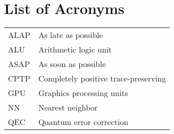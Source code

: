 \chapter*{List of Acronyms}

\begin{table}[ht]
\centering
\begin{tabular}{ll}
ALAP & As late as possible\\
ALU & Arithmetic logic unit\\
ASAP & As soon as possible\\
CPTP & Completely positive trace-preserving\\ 
GPU & Graphics processing units\\
NN & Nearest neighbor\\
QEC & Quantum error correction\\

\end{tabular}
\end{table}
